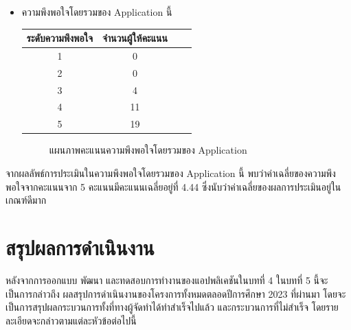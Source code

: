 \documentclass[14pt,oneside,openright,a4paper]{cpe-thai-project}
\begin{document}
\begin{itemize}
  \item ความพึงพอใจโดยรวมของ Application นี้
  \begin{table}[!h]
    \centering
    \captionsetup{justification=centering} %
    \begin{tabular}{|c|c|c|c|}
      \hline
      \multicolumn{1}{|c|}{\cellcolor[HTML]{9FC5E8}ระดับความพึงพอใจ} &
        \multicolumn{1}{c|}{\cellcolor[HTML]{9FC5E8}จำนวนผู้ให้คะแนน} \\ \hline
       1 & 0
         \\ \hline 
       2 & 0
         \\ \hline 
       3 & 4
         \\ \hline 
       4 & 11
         \\ \hline 
       5 & 19
         \\ \hline
    \end{tabular}
    \label{tab:Featuresatisfaction}
  \end{table}
  \begin{figure}[!h]\centering
    \setlength{\fboxrule}{0.5mm} %
    \setlength{\fboxsep}{0.5cm}
    \caption{แผนภาพคะแนนความพึงพอใจโดยรวมของ Application}\label{fig:NotificationTest}
  \end{figure}
\end{itemize}
จากผลลัพธ์การประเมินในความพึงพอใจโดยรวมของ Application นี้ พบว่าค่าเฉลี่ยของความพึงพอใจจากคะแนนจาก 5 คะแนนมีคะแนนเฉลี่ยอยู่ที่ 4.44 ซึ่งนับว่าค่าเฉลี่ยของผลการประเมินอยู่ในเกณฑ์ดีมาก
\newpage
\chapter{สรุปผลการดำเนินงาน}
หลังจากการออกแบบ พัฒนา และทดสอบการทํางานของแอปพลิเคชันในบทที่ 4 ในบทที่ 5 นี้จะเป็นการกล่าวถึง
ผลสรุปการดำเนินงานของโครงการทั้งหมดตลอดปีการศึกษา 2023 ที่ผ่านมา โดยจะเป็นการสรุปผลกระบวนการทั้งที่ทางผู้จัดทำได้ทำสำเร็จไปแล้ว 
และกระบวนการที่ไม่สำเร็จ โดยรายละเอียดจะกล่าวตามแต่ละหัวข้อต่อไปนี้
\end{document}
